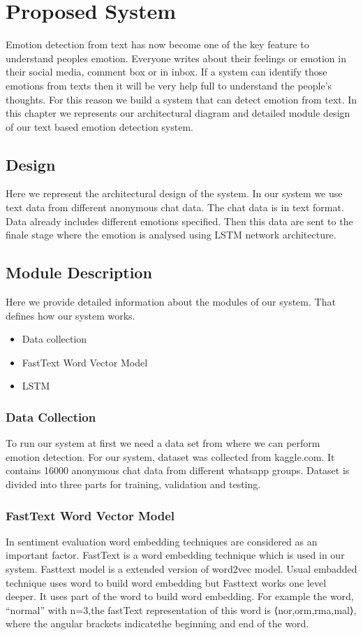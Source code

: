 \chapter{Proposed System}
\label{ch:Proposed System}
Emotion detection from text has now become one of the key feature to understand peoples emotion. Everyone writes about their feelings or emotion in their social media, comment box or in inbox. If a system can identify those emotions from texts then it will be very help full to understand the people's thoughts. For this reason we build a system that can detect emotion from text. In this chapter we represents our architectural diagram and detailed module design of our text based emotion detection system.

\section{Design}
Here we represent the architectural design of the system. In our system we use text data from different anonymous chat data. The chat data is in text format. Data already includes different emotions specified. Then this data are sent to the finale stage where the emotion is analysed using LSTM network architecture.


\section{Module Description}
Here we provide detailed information about the modules of our system. That defines how our system works.
\begin{itemize}
\item Data collection
\item FastText Word Vector Model
\item LSTM
\end{itemize}

\subsection{Data Collection}
To run our system at first we need a data set from where we can perform emotion detection. For our system, dataset was collected from kaggle.com. It contains 16000 anonymous chat data from different whatsapp groups. Dataset is divided into three parts for training, validation and testing.


\subsection{FastText Word Vector Model}
In sentiment evaluation word embedding techniques are considered as an important factor. FastText is a word embedding technique which is used in our system. Fasttext model is a extended version of word2vec model. Usual embadded technique uses word to build word embedding but Fasttext works one level deeper. It uses part of the word to build word embedding. For example the word, “normal” with n=3,the fastText representation of this word is ⟨nor,orm,rma,mal⟩, where the angular brackets indicatethe beginning and end of the word.

